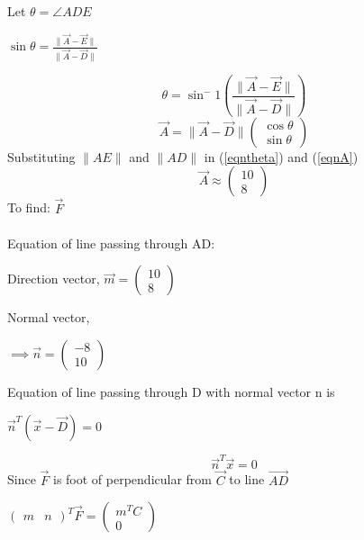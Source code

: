 \documentclass[letterpaper,12pt]{article}
\begin{document}
Let $\theta = \angle ADE$
\begin{center}
    $\sin \theta = \frac{\|\Vec{A}-\Vec{E}\|}{\|\Vec{A}-\Vec{D}\|}$
\end{center}
\begin{equation}
    \theta = \sin^-1\left(\frac{\|\Vec{A}-\Vec{E}\|}{\|\Vec{A}-\Vec{D}\|}\right)
\label{eqntheta}
\end{equation}
\begin{equation}
    \Vec{A} = \|\Vec{A}-\Vec{D}\|\begin{pmatrix} \cos \theta \\ \sin \theta \end{pmatrix}
\label{eqnA}
\end{equation}
Substituting $\|AE\|$ and $\|AD\|$ in (\ref*{eqntheta}) and (\ref*{eqnA})
\begin{equation}
    \Vec{A} \approx \begin{pmatrix} 10 \\ 8 \end{pmatrix}
\end{equation}
To find: $\Vec{F}$ \\ \\
Equation of line passing through AD:
\begin{center}
    Direction vector, $\Vec{m} = \begin{pmatrix} 10 \\ 8 \end{pmatrix}$
\end{center}
Normal vector,
\begin{center}
    $\implies \Vec{n} = \begin{pmatrix} -8 \\ 10 \end{pmatrix}$
\end{center}
Equation of line passing through D with normal vector n is
\begin{center}
    $\Vec{n}^T(\Vec{x} - \Vec{D}) = 0$
\end{center}
\begin{equation}
    \Vec{n}^T\Vec{x} = 0
\end{equation}
Since $\Vec{F}$ is foot of perpendicular from $\Vec{C}$ to line $\Vec{AD}$
\begin{center}
    $\begin{pmatrix}m & n\end{pmatrix}^T\Vec{F} = \begin{pmatrix} m^TC \\ 0 \end{pmatrix}$
\end{center}
\end{document}
